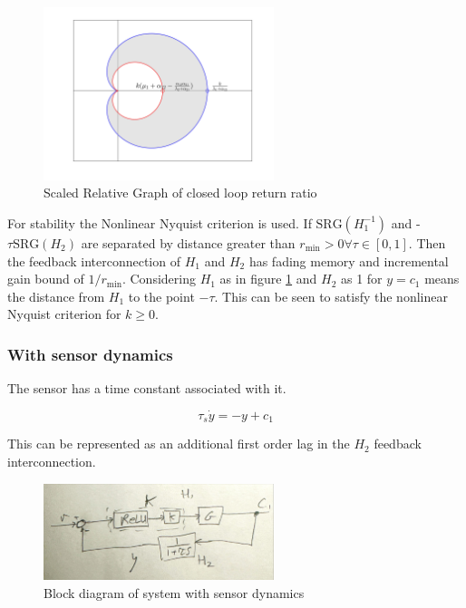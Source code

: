 \documentclass{article}
\begin{document}
\begin{figure}[H]
    \centering
    \includegraphics[width=0.6\textwidth]{figures/closed_loop_return_ratio.png}
    \caption{Scaled Relative Graph of closed loop return ratio}
    \label{fig:return_ratio_srg}
\end{figure}

For stability the Nonlinear Nyquist criterion is used.
If $\text{SRG}(H_1^{-1})$ and -$\tau \text{SRG}(H_2)$ are separated by distance greater than $r_\text{min} > 0 \forall \tau \in [0,1]$.
Then the feedback interconnection of $H_1$ and $H_2$ has fading memory and incremental gain bound of $1/r_\text{min}$.
Considering $H_1$ as in figure \ref{fig:return_ratio_srg} and $H_2$ as 1 for $y=c_1$ means the distance from $H_1$ to the point $-\tau$.
This can be seen to satisfy the nonlinear Nyquist criterion for $k \geq 0$.

\subsubsection{With sensor dynamics}

The sensor has a time constant associated with it.

\begin{equation}
    \tau_s \dot{y} = -y + c_1
\end{equation}

This can be represented as an additional first order lag in the $H_2$ feedback interconnection.

\begin{figure}[H]
    \centering
    \includegraphics[width=0.6\textwidth]{figures/sensor_dynamics.jpg}
    \caption{Block diagram of system with sensor dynamics}
    \label{fig:sensor_dynamic_block}
\end{figure}
\end{document}
